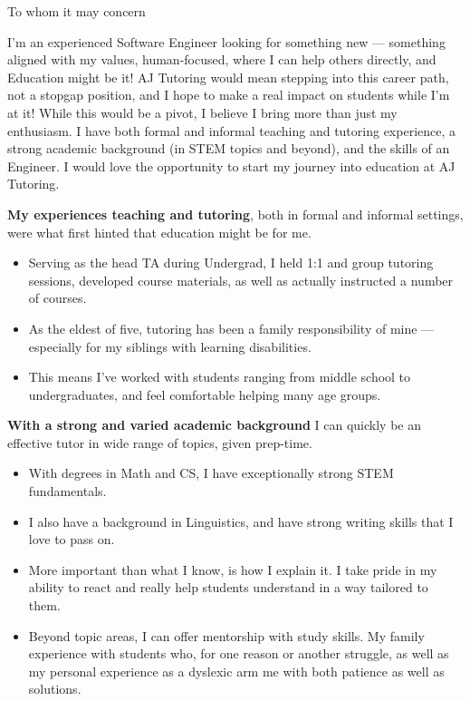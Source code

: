 \documentclass[sans, a4paper, 11pt]{article}
\newcommand{\cvcolor}[1]{{\color{MidnightBlue}#1}}
\renewcommand{\hl}[1]{\cvcolor{\textbf{#1}}}
\begin{document}
\begin{adjustwidth}{40pt}{40pt}

  To whom it may concern\par \bigskip

  I'm an experienced Software Engineer looking for something new --- something
  aligned with my values, human-focused, where I can help others directly, and
  Education might be it! AJ Tutoring would mean stepping into this career path,
  not a stopgap position, and I hope to make a real impact on students while
  I'm at it! While this would be a pivot, I believe I bring more than just my
  enthusiasm. I have both formal and informal teaching and tutoring experience,
  a strong academic background (in STEM topics and beyond), and the skills of
  an Engineer. I would love the opportunity to start my journey into education
  at AJ Tutoring.

  \medskip

  \hl{My experiences teaching and tutoring}, both in formal and informal
  settings, were what first hinted that education might be for me.
  \smallskip

  \begin{itemize}
    \item Serving as the head TA during Undergrad, I held 1:1 and group
      tutoring sessions, developed course materials, as well as actually
      instructed a number of courses.
    \item As the eldest of five, tutoring has been a family responsibility of
      mine --- especially for my siblings with learning disabilities.
    \item This means I've worked with students ranging from middle school to
      undergraduates, and feel comfortable helping many age groups.
  \end{itemize}
  \smallskip

  \hl{With a strong and varied academic background} I can quickly be an
  effective tutor in wide range of topics, given prep-time.
  \smallskip

  \begin{itemize}
    \item With degrees in Math and CS, I have exceptionally strong STEM
      fundamentals.
    \item I also have a background in Linguistics, and have strong writing
      skills that I love to pass on.
    \item More important than what I know, is how I explain it. I take pride in
      my ability to react and really help students understand in a way tailored
      to them.
    \item Beyond topic areas, I can offer mentorship with study skills. My
      family experience with students who, for one reason or another struggle,
      as well as my personal experience as a dyslexic arm me with both patience
      as well as solutions.
  \end{itemize}
  \smallskip


\end{adjustwidth}
\end{document}
